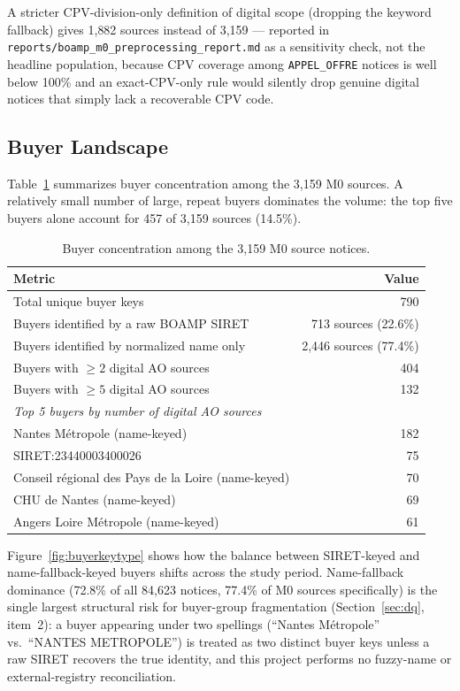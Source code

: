 \documentclass[11pt]{article}
\begin{document}
A stricter CPV-division-only definition of digital scope (dropping the
keyword fallback) gives 1{,}882 sources instead of 3{,}159 --- reported in
\texttt{reports/boamp\_m0\_preprocessing\_report.md} as a sensitivity check,
not the headline population, because CPV coverage among \texttt{APPEL\_OFFRE}
notices is well below 100\% and an exact-CPV-only rule would silently drop
genuine digital notices that simply lack a recoverable CPV code.

\subsection{Buyer Landscape}
Table~\ref{tab:buyerland} summarizes buyer concentration among the 3{,}159
M0 sources. A relatively small number of large, repeat buyers dominates the
volume: the top five buyers alone account for 457 of 3{,}159 sources
(14.5\%).

\begin{table}[h!]
\centering
\caption{Buyer concentration among the 3{,}159 M0 source notices.}
\label{tab:buyerland}
\begin{tabular}{lr}
\toprule
Metric & Value \\
\midrule
Total unique buyer keys & 790 \\
Buyers identified by a raw BOAMP SIRET & 713 sources (22.6\%) \\
Buyers identified by normalized name only & 2{,}446 sources (77.4\%) \\
Buyers with $\geq 2$ digital AO sources & 404 \\
Buyers with $\geq 5$ digital AO sources & 132 \\
\midrule
\multicolumn{2}{l}{\emph{Top 5 buyers by number of digital AO sources}} \\
Nantes M\'etropole (name-keyed) & 182 \\
SIRET:23440003400026 & 75 \\
Conseil r\'egional des Pays de la Loire (name-keyed) & 70 \\
CHU de Nantes (name-keyed) & 69 \\
Angers Loire M\'etropole (name-keyed) & 61 \\
\bottomrule
\end{tabular}
\end{table}

Figure~\ref{fig:buyerkeytype} shows how the balance between SIRET-keyed and
name-fallback-keyed buyers shifts across the study period. Name-fallback
dominance (72.8\% of all 84{,}623 notices, 77.4\% of M0 sources specifically)
is the single largest structural risk for buyer-group fragmentation
(Section~\ref{sec:dq}, item~2): a buyer appearing under two spellings
(``Nantes M\'etropole'' vs.\ ``NANTES METROPOLE'') is treated as two
distinct buyer keys unless a raw SIRET recovers the true identity, and this
project performs no fuzzy-name or external-registry reconciliation.
\end{document}
